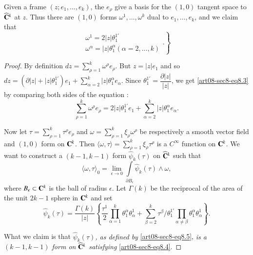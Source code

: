 Given a frame $(z;e_{1},\ldots,e_{k})$, the $e_{\rho}$ give a basis for the $(1,0)$ tangent space to $\widehat{\mathbf{C}}^{k}$ at $z$. Thus there are $(1,0)$ forms $\omega^{1},\ldots,\omega^{k}$ dual to $e_{1},\ldots,e_{k}$, and we claim that
\begin{equation}
\left.
\begin{array}{l}
\omega^{1}=2|z|\theta^{1'}_{1}\\
\omega^{\alpha}=|z|\theta^{\alpha}_{1}(\alpha=2,\ldots,k)
\end{array}.\label{art08-sec8-eq8.3}
\right\}
\end{equation}

\begin{proof}
By definition $dz=\sum\limits^{k}_{\rho=1}\omega^{\rho}e_{\rho}$. But $z=|z|e_{1}$ and so $dz=(\partial |z|+|z|\theta^{1'}_{1})e_{1}+\sum\limits^{k}_{\alpha=2}|z|\theta^{\alpha}_{1}e_{\alpha}$. Since $\theta^{1'}_{1}=\dfrac{\partial|z|}{|z|}$, we get \eqref{art08-sec8-eq8.3} by comparing both sides of the equation :
$$
\sum\limits^{k}_{\rho=1}\omega^{\rho}e_{\rho}=2|z|\theta^{1'}_{1}e_{1}+\sum\limits^{k}_{\alpha=2}|z|\theta^{\alpha}_{1}e_{\alpha}.
$$

Now let $\tau=\sum\limits^{k}_{\rho=1}\tau^{\rho}e_{\rho}$ and $\omega=\sum\limits^{k}_{\rho=1}\xi_{\rho}\omega^{\rho}$ be respectively a smooth vector field and $(1,0)$ form on $\mathbf{C}^{k}$. Then $\langle \omega,\tau\rangle=\sum\limits^{k}_{\rho=1}\xi_{\rho}\tau^{\rho}$ is a $C^{\infty}$ function on $\mathbf{C}^{k}$. We want to construct a $(k-1,k-1)$ form $\widehat{\psi}_{k}(\tau)$ on $\widehat{\mathbf{C}}^{k}$ such that
\begin{equation}
\langle \omega,\tau\rangle_{0}=\lim\limits_{\epsilon\to 0}\int\limits_{\partial B_{\epsilon}}\widehat{\psi}_{k}(\tau)\wedge \omega,\label{art08-sec8-eq8.4}
\end{equation}
where $B_{\epsilon}\subset \mathbf{C}^{k}$ is the ball of radius $\epsilon$. Let $\Gamma(k)$ be the reciprocal of the area of the unit $2k-1$ sphere in $\mathbf{C}^{k}$ and set 
\begin{equation}
\widehat{\psi}_{k}(\tau)=\dfrac{\Gamma(k)}{|z|}\left\{\dfrac{\tau^{1}}{2}\prod\limits^{k}_{\alpha=1}\theta^{\alpha}_{1}\theta^{1}_{\alpha}+\sum\limits^{k}_{\beta=2}\tau^{\beta}/\theta^{1'}_{1}\prod\limits_{\alpha\neq \beta}\theta^{\alpha}_{1}\theta^{1}_{\alpha}\right\}.\label{art08-sec8-eq8.5}
\end{equation}

What we claim is that {\em $\widehat{\psi}_{k}(\tau)$, as defined by} \eqref{art08-sec8-eq8.5}, {\em is a $(k-1,k-1)$ form on $\widehat{\mathbf{C}}^{k}$ satisfying} \eqref{art08-sec8-eq8.4}. 
\end{proof}

